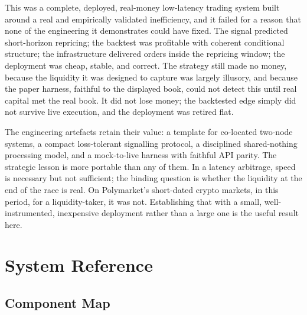 \documentclass{tmsce}
\let\oldsection\section
\renewcommand{\section}{\clearpage\oldsection}
\begin{document}
This was a complete, deployed, real-money low-latency trading system built around a
real and empirically validated inefficiency, and it failed for a reason that none of
the engineering it demonstrates could have fixed. The signal predicted short-horizon
repricing; the backtest was profitable with coherent conditional structure; the
infrastructure delivered orders inside the repricing window; the deployment was
cheap, stable, and correct. The strategy still made no money, because the liquidity it
was designed to capture was largely illusory, and because the paper harness, faithful
to the displayed book, could not detect this until real capital met the real book. It
did not lose money; the backtested edge simply did not survive live execution, and the
deployment was retired flat.

\medskip
\noindent The engineering artefacts retain their value: a template for co-located
two-node systems, a compact loss-tolerant signalling protocol, a disciplined
shared-nothing processing model, and a mock-to-live harness with faithful API parity. The
strategic lesson is more portable than any of them. In a latency arbitrage, speed is
necessary but not sufficient; the binding question is whether the liquidity at the
end of the race is real. On Polymarket's short-dated crypto markets, in this period,
for a liquidity-taker, it was not. Establishing that with a small, well-instrumented,
inexpensive deployment rather than a large one is the useful result here.


\appendix
\section{System Reference}

\subsection{Component Map}
\end{document}

